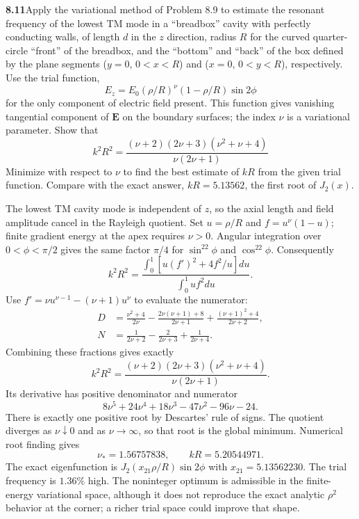 \par\bigskip
\noindent\textbf{8.11}\quad Apply the variational method of Problem 8.9 to estimate the resonant frequency of the lowest TM mode in a ``breadbox'' cavity with perfectly conducting walls, of length $d$ in the $z$ direction, radius $R$ for the curved quarter-circle ``front'' of the breadbox, and the ``bottom'' and ``back'' of the box defined by the plane segments ($y=0$, $0<x<R$) and ($x=0$, $0<y<R$), respectively. Use the trial function,
\[
E_{z}=E_{0}(\rho/R)^{\nu}(1-\rho/R)\sin 2\phi
\]
for the only component of electric field present. This function gives vanishing tangential component of $\mathbf{E}$ on the boundary surfaces; the index $\nu$ is a variational parameter. Show that
\[
k^{2}R^{2}=\frac{(\nu+2)(2\nu+3)(\nu^{2}+\nu+4)}{\nu(2\nu+1)}
\]
Minimize with respect to $\nu$ to find the best estimate of $kR$ from the given trial function. Compare with the exact answer, $kR=5.13562$, the first root of $J_{2}(x)$.
\solution

The lowest TM cavity mode is independent of $z$, so the axial length
and field amplitude cancel in the Rayleigh quotient.  Set
$u=\rho/R$ and $f=u^\nu(1-u)$; finite gradient energy at the apex
requires $\nu>0$.  Angular integration over $0<\phi<\pi/2$ gives
the same factor $\pi/4$ for $\sin^22\phi$ and $\cos^22\phi$.
Consequently
\[
k^2R^2=\frac{\int_0^1[u(f')^2+4f^2/u]du}{\int_0^1uf^2du}.
\]
Use $f'=\nu u^{\nu-1}-(\nu+1)u^\nu$ to evaluate the numerator:
\begin{align*}
D&=\frac{\nu^2+4}{2\nu}
-\frac{2\nu(\nu+1)+8}{2\nu+1}
+\frac{(\nu+1)^2+4}{2\nu+2},\\
N&=\frac1{2\nu+2}-\frac2{2\nu+3}+\frac1{2\nu+4}.
\end{align*}
Combining these fractions gives exactly
\[
\boxed{k^2R^2=\frac{(\nu+2)(2\nu+3)(\nu^2+\nu+4)}{\nu(2\nu+1)}.}
\]
Its derivative has positive denominator and numerator
\[
8\nu^5+24\nu^4+18\nu^3-47\nu^2-96\nu-24.
\]
There is exactly one positive root by Descartes' rule of signs.
The quotient diverges as $\nu\downarrow0$ and as $\nu\to\infty$,
so that root is the global minimum.  Numerical root finding gives
\[
\nu_*=1.56757838,\qquad \boxed{kR=5.20544971.}
\]
The exact eigenfunction is $J_2(x_{21}\rho/R)\sin2\phi$ with
$x_{21}=5.13562230$.  The trial frequency is $1.36\%$ high.
The noninteger optimum is admissible in the finite-energy variational
space, although it does not reproduce the exact analytic $\rho^2$
behavior at the corner; a richer trial space could improve that shape.

